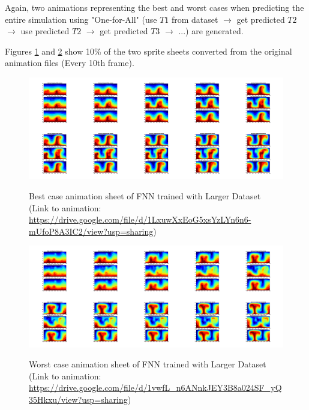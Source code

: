 Again, two animations representing the best and worst cases when predicting the entire simulation using "One-for-All" (use $T1$ from dataset $\rightarrow$ get predicted $T2$ $\rightarrow$ use predicted $T2$ $\rightarrow$ get predicted $T3$ $\rightarrow$ ...) are generated.

Figures \ref{figure:FNN_larger_best_gif} and \ref{figure:FNN_larger_worst_gif} show 10\% of the two sprite sheets converted from the original animation files (Every 10th frame).

\begin{figure}[H]
    \centering
    \caption{Best case animation sheet of FNN trained with Larger Dataset (Link to animation: \url{https://drive.google.com/file/d/1LxuwXxEoG5xsYzLYn6n6-mUfoP8A3IC2/view?usp=sharing})}
    \includegraphics[scale=0.10]{figures/mantle_convection_images/larger_dataset/FNN_Best_GIF_sheet.png}
    \label{figure:FNN_larger_best_gif}
\end{figure}

\begin{figure}[H]
    \centering
    \caption{Worst case animation sheet of FNN trained with Larger Dataset (Link to animation: 
    \url{https://drive.google.com/file/d/1vwfL_n6ANnkJEY3B8a024SF_yQ35Hkxu/view?usp=sharing})}
    \includegraphics[scale=0.10]{figures/mantle_convection_images/larger_dataset/FNN_Worst_GIF_sheet.png}
    \label{figure:FNN_larger_worst_gif}
\end{figure}

